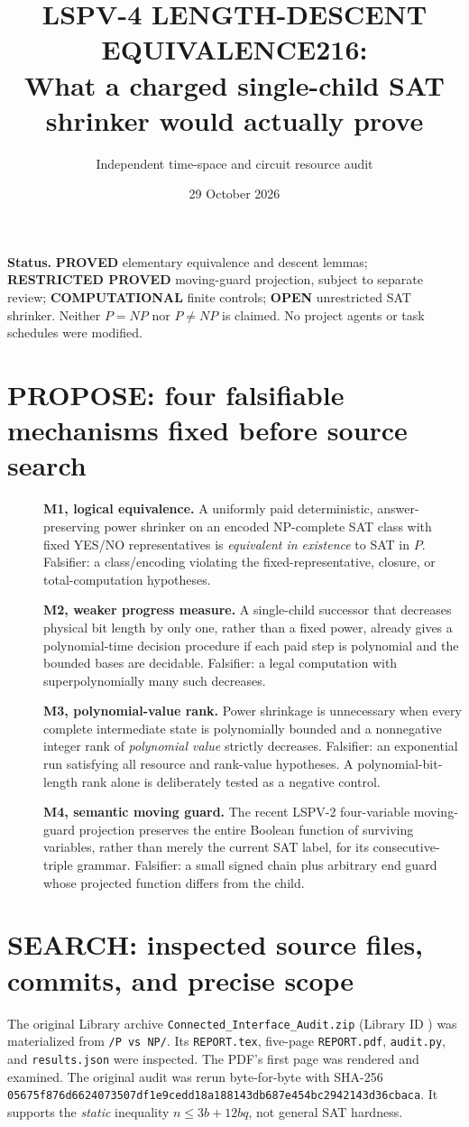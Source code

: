 \documentclass[11pt]{article}
\title{LSPV-4 LENGTH-DESCENT EQUIVALENCE216:\\What a charged single-child SAT shrinker would actually prove}
\author{Independent time-space and circuit resource audit}
\date{29 October 2026}
\begin{document}
\maketitle
\noindent\textbf{Status.} \textbf{PROVED} elementary equivalence and descent lemmas; \textbf{RESTRICTED PROVED} moving-guard projection, subject to separate review; \textbf{COMPUTATIONAL} finite controls; \textbf{OPEN} unrestricted SAT shrinker. Neither $P=NP$ nor $P\ne NP$ is claimed. No project agents or task schedules were modified.

\section{PROPOSE: four falsifiable mechanisms fixed before source search}
\begin{description}
\item[] \textbf{M1, logical equivalence.} A uniformly paid deterministic, answer-preserving power shrinker on an encoded NP-complete SAT class with fixed YES/NO representatives is \emph{equivalent in existence} to SAT in $P$. Falsifier: a class/encoding violating the fixed-representative, closure, or total-computation hypotheses.
\item[] \textbf{M2, weaker progress measure.} A single-child successor that decreases physical bit length by only one, rather than a fixed power, already gives a polynomial-time decision procedure if each paid step is polynomial and the bounded bases are decidable. Falsifier: a legal computation with superpolynomially many such decreases.
\item[] \textbf{M3, polynomial-value rank.} Power shrinkage is unnecessary when every complete intermediate state is polynomially bounded and a nonnegative integer rank of \emph{polynomial value} strictly decreases. Falsifier: an exponential run satisfying all resource and rank-value hypotheses. A polynomial-bit-length rank alone is deliberately tested as a negative control.
\item[] \textbf{M4, semantic moving guard.} The recent LSPV-2 four-variable moving-guard projection preserves the entire Boolean function of surviving variables, rather than merely the current SAT label, for its consecutive-triple grammar. Falsifier: a small signed chain plus arbitrary end guard whose projected function differs from the child.
\end{description}

\section{SEARCH: inspected source files, commits, and precise scope}
The original Library archive \texttt{Connected\_Interface\_Audit.zip} (Library ID ) was materialized from \texttt{/P vs NP/}. Its \texttt{REPORT.tex}, five-page \texttt{REPORT.pdf}, \texttt{audit.py}, and \texttt{results.json} were inspected. The PDF's first page was rendered and examined. The original audit was rerun byte-for-byte with SHA-256 \texttt{05675f876d6624073507df1e9cedd18a}\allowbreak\texttt{188143db687e454bc2942143d36cbaca}. It supports the \emph{static} inequality $n\le3b+12bq$, not general SAT hardness.
\end{document}
